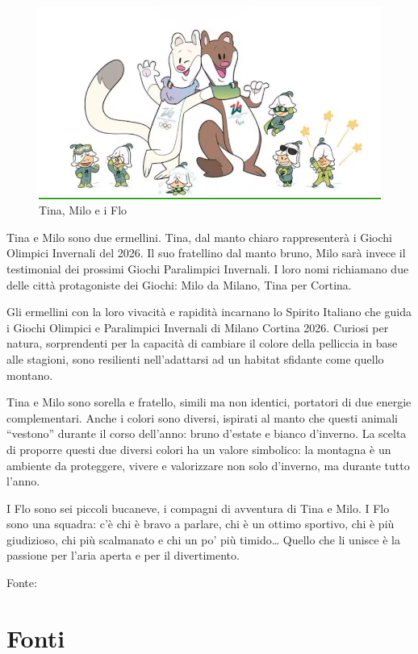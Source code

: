 \documentclass[
]{book}
\begin{document}
\begin{figure}
\includegraphics[width=0.6\linewidth]{images/mascotte/MilanoCortina2026_mascotte} \caption{Tina, Milo e i Flo}\label{fig:unnamed-chunk-95}
\end{figure}

Tina e Milo sono due ermellini.
Tina, dal manto chiaro rappresenterà i Giochi Olimpici Invernali del 2026. Il suo fratellino dal manto bruno, Milo sarà invece il testimonial dei prossimi Giochi Paralimpici Invernali. I loro nomi richiamano due delle città protagoniste dei Giochi: Milo da Milano, Tina per Cortina.

Gli ermellini con la loro vivacità e rapidità incarnano lo Spirito Italiano che guida i Giochi Olimpici e Paralimpici Invernali di Milano Cortina 2026. Curiosi per natura, sorprendenti per la capacità di cambiare il colore della pelliccia in base alle stagioni, sono resilienti nell'adattarsi ad un habitat sfidante come quello montano.

Tina e Milo sono sorella e fratello, simili ma non identici, portatori di due energie complementari. Anche i colori sono diversi, ispirati al manto che questi animali ``vestono'' durante il corso dell'anno: bruno d'estate e bianco d'inverno. La scelta di proporre questi due diversi colori ha un valore simbolico: la montagna è un ambiente da proteggere, vivere e valorizzare non solo d'inverno, ma durante tutto l'anno.

I Flo sono sei piccoli bucaneve, i compagni di avventura di Tina e Milo.
I Flo sono una squadra: c'è chi è bravo a parlare, chi è un ottimo sportivo, chi è più giudizioso, chi più scalmanato e chi un po' più timido\ldots{} Quello che li unisce è la passione per l'aria aperta e per il divertimento.

Fonte: \citep{milanocortina2026}

\chapter*{Fonti}\label{fonti}
\end{document}
